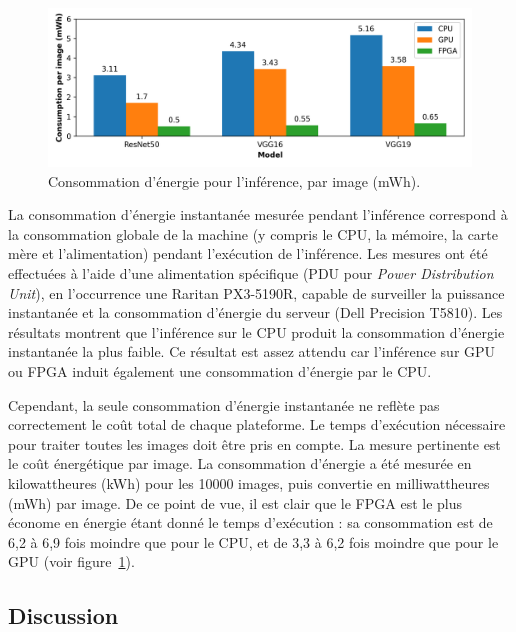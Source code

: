 \begin{figure}[!ht]
    \centering
    \includegraphics[width=\columnwidth]{4_Chapitre4/figures/characterization/consumption_per_image.png}
    \caption{Consommation d'énergie pour l'inférence, par image (mWh).}
    \label{figure:herofake-consumption-per-image}
\end{figure}

La consommation d'énergie instantanée mesurée pendant l'inférence correspond à la consommation globale de la machine (y compris le CPU, la mémoire, la carte mère et l'alimentation) pendant l'exécution de l'inférence.
Les mesures ont été effectuées à l'aide d'une alimentation spécifique (PDU pour \textit{Power Distribution Unit}), en l'occurrence une Raritan PX3-5190R, capable de surveiller la puissance instantanée et la consommation d'énergie du serveur (Dell Precision T5810). Les résultats montrent que l'inférence sur le CPU produit la consommation d'énergie instantanée la plus faible. Ce résultat est assez attendu car l'inférence sur GPU ou FPGA induit également une consommation d'énergie par le CPU.

Cependant, la seule consommation d'énergie instantanée ne reflète pas correctement le coût total de chaque plateforme. Le temps d'exécution nécessaire pour traiter toutes les images doit être pris en compte. La mesure pertinente est le coût énergétique par image. La consommation d'énergie a été mesurée en kilowattheures (kWh) pour les 10000 images, puis convertie en milliwattheures (mWh) par image. De ce point de vue, il est clair que le FPGA est le plus économe en énergie étant donné le temps d'exécution : sa consommation est de 6,2 à 6,9 fois moindre que pour le CPU, et de 3,3 à 6,2 fois moindre que pour le GPU (voir figure~\ref{figure:herofake-consumption-per-image}).

\subsection{Discussion}

